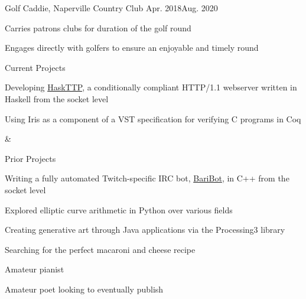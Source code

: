 \documentclass[10.5pt]{resume}
\begin{document}
\begin{Experience}
	\begin{ExpEntry}{Golf Caddie, Naperville Country Club}
		{Apr. 2018}{Aug. 2020}
		\item Carries patrons clubs for duration of the golf round
		\item Engages directly with golfers to ensure an enjoyable and timely round
	\end{ExpEntry} 
\end{Experience}

\begin{Projects}
	\begin{TitleDescription}{Current Projects}
		\item Developing \href{https://github.com/Baricus/HaskTTP}{HaskTTP}, a conditionally compliant HTTP/1.1 webserver written in Haskell from the socket level
		\item Using Iris as a component of a VST specification for verifying C programs in Coq
	\end{TitleDescription}

	&
	\begin{TitleDescription}{Prior Projects}
		\item Writing a fully automated Twitch-specific IRC bot, \href{https://github.com/Baricus/BariBot}{BariBot}, in C++ from the socket level
		\item Explored elliptic curve arithmetic in Python over various fields
		\item Creating generative art through Java applications via the Processing3 library

	\end{TitleDescription}	
\end{Projects}

\begin{Activities}
	\item Searching for the perfect macaroni and cheese recipe
	\item Amateur pianist
	\item Amateur poet looking to eventually publish
\end{Activities}
\end{document}
